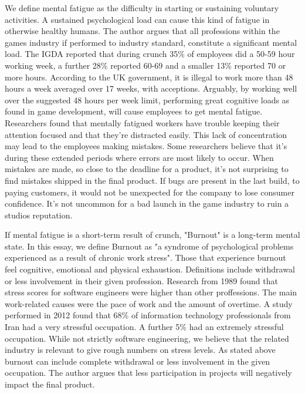 \documentclass{scrartcl}
\begin{document}
We define mental fatigue as the difficulty in starting or sustaining voluntary activities\cite{chaudhuri2004fatigue}. A sustained psychological load can cause this kind of fatigue in otherwise healthy humans\cite {mizuno2011mental}. The author argues that all professions within the games industry if performed to industry standard, constitute a significant mental load. The IGDA reported that during crunch 35\% of employees did a 50-59 hour working week, a further 28\% reported 60-69 and a smaller 13\% reported 70 or more hours\cite[p.20]{weststarlegault2016}. According to the UK government, it is illegal to work more than 48 hours a week averaged over 17 weeks, with acceptions\cite{maximumweeklyhours}. Arguably, by working well over the suggested 48 hours per week limit, performing great cognitive loads as found in game development, will cause employees to get mental fatigue. Researchers found that mentally fatigued workers have trouble keeping their attention focused and that they're distracted easily\cite{bartlett1943ferrier}. This lack of concentration may lead to the employees making mistakes. Some researchers believe that it's during these extended periods where errors are most likely to occur\cite{olson2011overtime}. When mistakes are made, so close to the deadline for a product, it's not surprising to find mistakes shipped in the final product. If bugs are present in the last build, to paying customers, it would not be unexpected for the company to lose consumer confidence.  It's not uncommon for a bad launch in the game industry to ruin a studios reputation. 


If mental fatigue is a short-term result of crunch, "Burnout" is a long-term mental state. In this essay, we define Burnout as "a syndrome of psychological problems experienced as a result of chronic work stress"\cite{milfont2008burnout}. Those that experience burnout feel cognitive, emotional and physical exhaustion\cite{sonnentag1994stressor}. Definitions include withdrawal or less involvement in their given profession\cite{sonnentag1994stressor}. Research from 1989 found that stress scores for software engineers were higher than other proffessions\cite{kumash1989work}. The main work-related causes were the pace of work and the amount of overtime\cite{kumash1989work}. A study performed in 2012 found that 68\% of information technology professionals from Iran had a very stressful occupation\cite{bolhari2012occupational}. A further 5\% had an extremely stressful occupation\cite{bolhari2012occupational}. While not strictly software engineering, we believe that the related industry is relevant to give rough numbers on stress levels. As stated above burnout can include complete withdrawal or less involvement in the given occupation. The author argues that less participation in projects will negatively impact the final product. 


\end{document}
